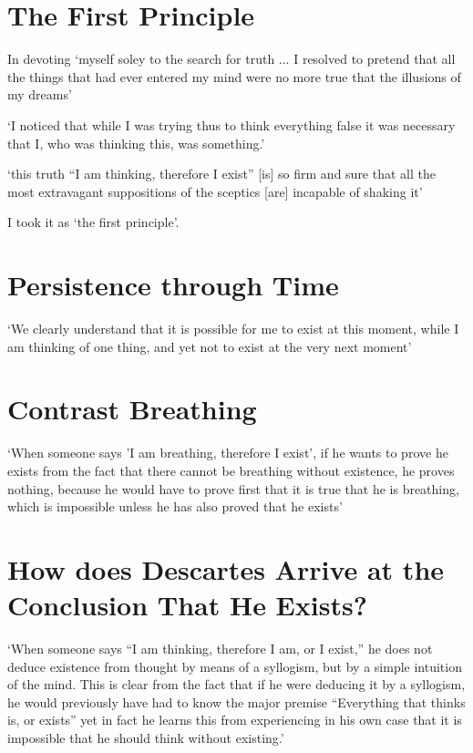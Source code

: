 \documentclass[12pt]{extarticle}
\begin{document}
\begin{multicols*}{3}
\section{The First Principle}
In devoting ‘myself soley to the search for truth
... I resolved to 
pretend
 that all the things that had ever
entered my mind were no more true
that the illusions of my dreams’
\citep[p.~127 AT 6:32]{descartes:1985_csm1}
 
‘I noticed that while I was trying thus to think everything false
it was necessary that I,
who was thinking this,
was something.’
\citep[p.~126 AT 6:31]{descartes:1985_csm1}
 
‘this truth
“I am thinking, therefore I exist”
[is] so firm and sure 
that all the most extravagant suppositions of the sceptics [are] incapable of shaking it’
 
I took it as ‘the first principle’.
\citep[p.~126 AT 6:31]{descartes:1985_csm1}

\section{Persistence through Time}
‘We clearly understand that it is possible for me to exist at this moment, while I am thinking of
one thing, and yet not to exist at the very next moment’
\citep[p.~355 AT V:192]{descartes:1984_vol3}
 
\section{Contrast Breathing}
‘When someone says 'I am breathing, therefore I exist', if he wants to prove he exists from the fact
that there cannot be breathing without existence, he proves nothing, because he would have to prove
first that it is true that he is breathing, which is impossible unless he has also proved that 
he exists’ 
\citep[p.~98 AT II:37]{descartes:1984_vol3}
 
\section{How does Descartes Arrive at the Conclusion That He Exists?}
‘When someone says “I am thinking, therefore I am, or I exist,” he does not deduce existence from thought by means of a syllogism, but by a simple intuition of the mind.  
This is clear from the fact that if he were deducing it by a syllogism, he would
previously have had to know the major premise “Everything that thinks is, or exists”
yet in fact
he learns this from experiencing in his own case that it is impossible that he should think
without existing.’
\citep[AT 7:140]{descartes:1985_csm2}
 

\end{multicols*}
\end{document}
